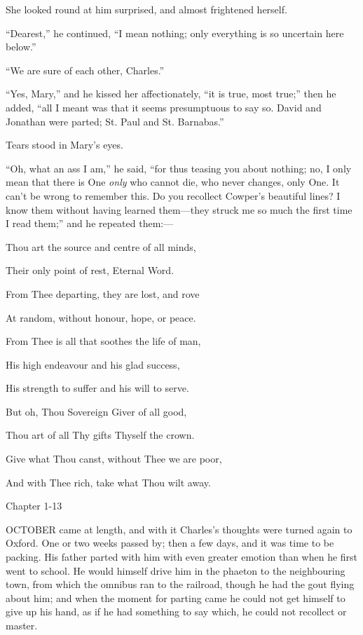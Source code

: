 She looked round at him surprised, and almost frightened herself.

``Dearest,'' he continued, ``I mean nothing; only
everything is so uncertain here below.''

``We are sure of each other, Charles.''

``Yes, Mary,'' and he kissed her affectionately, ``it
is true, most true;'' then he added, ``all I meant was that it
seems presumptuous to say so. David and Jonathan were parted; St. Paul
and St. Barnabas.''

Tears stood in Mary's eyes.

``Oh, what an ass I am,'' he said, ``for thus teasing
you about nothing; no, I only mean that there is One \emph{only} who
cannot die, who never changes, only One. It can't be wrong to remember
this. Do you recollect Cowper's beautiful lines? I know them without
having learned them—they struck me so much the first time I read
them;'' and he repeated them:—

Thou art the source and centre of all minds,

Their only point of rest, Eternal Word.

From Thee departing, they are lost, and rove

At random, without honour, hope, or peace.

From Thee is all that soothes the life of man,

His high endeavour and his glad success,

His strength to suffer and his will to serve.

But oh, Thou Sovereign Giver of all good,

Thou art of all Thy gifts Thyself the crown.

Give what Thou canst, without Thee we are poor,

And with Thee rich, take what Thou wilt away.

Chapter 1-13


OCTOBER came at length, and with it
Charles's thoughts were turned again to Oxford. One or two weeks
passed by; then a few days, and it was time to be packing. His father
parted with him with even greater emotion than when he first went to
school. He would himself drive him in the phaeton to the neighbouring
town, from which the omnibus ran to the railroad, though he had the
gout flying about him; and when the moment for parting came he could
not get himself to give up his hand, as if he had something to say
which, he could not recollect or master.

